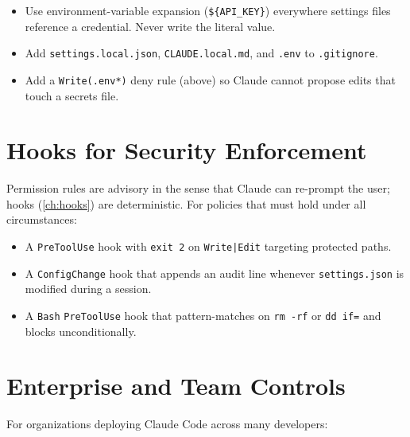 \begin{itemize}
  \item Use environment-variable expansion (\texttt{\$\{API\_KEY\}})
        everywhere settings files reference a credential. Never write
        the literal value.
  \item Add \texttt{settings.local.json}, \texttt{CLAUDE.local.md}, and
        \texttt{.env} to \texttt{.gitignore}.
  \item Add a \texttt{Write(.env*)} deny rule (above) so Claude cannot
        propose edits that touch a secrets file.
\end{itemize}

\section{Hooks for Security Enforcement}
\label{sec:security-hooks}


Permission rules are advisory in the sense that Claude can re-prompt the
user; hooks (\cref{ch:hooks}) are deterministic. For policies that must
hold under all circumstances:

\begin{itemize}
  \item A \texttt{PreToolUse} hook with \texttt{exit 2} on
        \texttt{Write|Edit} targeting protected paths.
  \item A \texttt{ConfigChange} hook that appends an audit line
        whenever \texttt{settings.json} is modified during a session.
  \item A \texttt{Bash} \texttt{PreToolUse} hook that pattern-matches on
        \texttt{rm -rf} or \texttt{dd if=} and blocks unconditionally.
\end{itemize}

\section{Enterprise and Team Controls}
\label{sec:enterprise}


For organizations deploying Claude Code across many developers:

